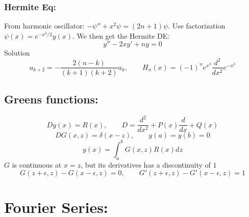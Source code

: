 \documentclass[a4paper,norsk, 10pt]{article}
\begin{document}
\subsubsection{Hermite Eq:}
From harmonic oscillator: $-\psi'' + x^2\psi = (2n+1)\psi$. Use factorization $\psi(x) = e^{-x^2/2}y(x)$. We then get the Hermite DE:
\begin{equation}
y'' - 2xy' +ny = 0
\end{equation}
Solution
\begin{equation}
a_{k+2} = -\frac{2(n-k)}{(k+1)(k+2)}a_k, \qquad H_n(x) = (-1)^ne^{x^2}\frac{d^2}{dx^2}e^{-x^2}
\end{equation}

\subsection{Greens functions:}
\begin{equation}
Dy(x) = R(x), \qquad D = \frac{d^2}{dx^2} + P(x)\frac{d}{dx} + Q(x)
\end{equation}
\begin{equation}
DG(x,z) = \delta(x-z), \qquad y(a) = y(b) = 0
\end{equation}
\begin{equation}
y(x) = \int_a^bG(x,z)R(x)dz 
\end{equation}
$G$ is continuous at $x = z$, but its derivatives has a discontinuity of $1$
\begin{equation}
G(z+\epsilon,z) - G(x-\epsilon,z) = 0, \qquad G'(z+\epsilon,z) - G'(x-\epsilon,z) = 1
\end{equation}

\section{Fourier Series:}
\end{document}
